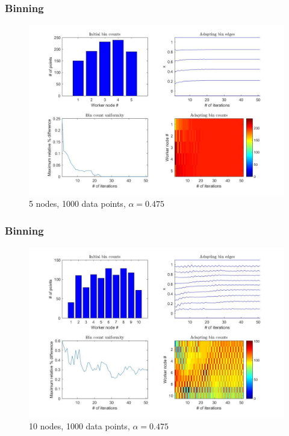 \documentclass{beamer}
\begin{document}
\begin{frame}
	\frametitle{Binning}
	
	\begin{figure}[!htb]
		\centering
		\vspace{-5pt}
		\includegraphics[scale = 0.25]{AdaptiveBinning_5Nodes_1000Lines_0475alpha}
		\vspace{-10pt}
		\caption{5 nodes, 1000 data points, $\alpha = 0.475$}
	\end{figure}
\end{frame}

\begin{frame}
	\frametitle{Binning}
	
	\begin{figure}[!htb]
		\centering
		\vspace{-5pt}
		\includegraphics[scale = 0.25]{AdaptiveBinning_10Nodes_1000Lines_0475alpha}
		\vspace{-10pt}
		\caption{10 nodes, 1000 data points, $\alpha = 0.475$}
	\end{figure}
\end{frame}
\end{document}
